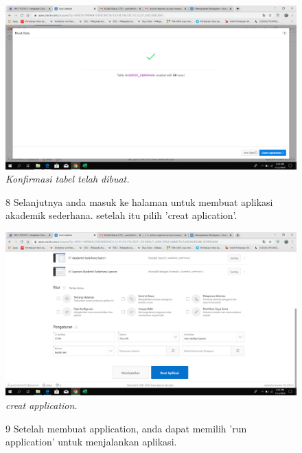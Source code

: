 \begin{enumerate}
\begin{figure}
    \begin{center}
\includegraphics[scale=0.2]{figures/ss6.png}
    \caption{\textit{Konfirmasi tabel telah dibuat.}}
        \end{center}
\label{gambar}
\end{figure}

\begin{figure}
\item[8] Selanjutnya anda masuk ke halaman untuk membuat aplikasi akademik sederhana. setelah itu pilih 'creat aplication'.

    \begin{center}
\includegraphics[scale=0.2]{figures/ss7.png}
    \caption{\textit{creat application.}}
        \end{center}
\label{gambar}
\end{figure}

\begin{figure}
\item[9] Setelah membuat application, anda dapat memilih 'run application' untuk menjalankan aplikasi.


\end{figure}
\end{enumerate}
